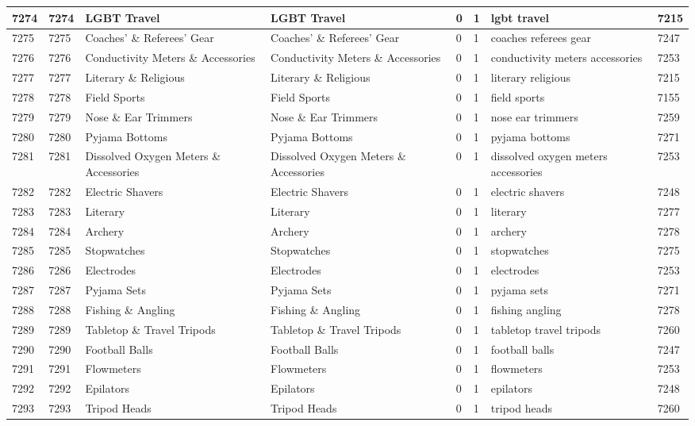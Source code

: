 \begin{longtable}{|l|l|l|l|l|l|l|l|}
7274 & 7274 & LGBT Travel & LGBT Travel & 0 & 1 & lgbt travel & 7215 \\ \hline 
7275 & 7275 & Coaches' \& Referees' Gear & Coaches' \& Referees' Gear & 0 & 1 & coaches referees gear & 7247 \\ \hline 
7276 & 7276 & Conductivity Meters \& Accessories & Conductivity Meters \& Accessories & 0 & 1 & conductivity meters accessories & 7253 \\ \hline 
7277 & 7277 & Literary \& Religious & Literary \& Religious & 0 & 1 & literary religious & 7215 \\ \hline 
7278 & 7278 & Field Sports & Field Sports & 0 & 1 & field sports & 7155 \\ \hline 
7279 & 7279 & Nose \& Ear Trimmers & Nose \& Ear Trimmers & 0 & 1 & nose ear trimmers & 7259 \\ \hline 
7280 & 7280 & Pyjama Bottoms & Pyjama Bottoms & 0 & 1 & pyjama bottoms & 7271 \\ \hline 
7281 & 7281 & Dissolved Oxygen Meters \& Accessories & Dissolved Oxygen Meters \& Accessories & 0 & 1 & dissolved oxygen meters accessories & 7253 \\ \hline 
7282 & 7282 & Electric Shavers & Electric Shavers & 0 & 1 & electric shavers & 7248 \\ \hline 
7283 & 7283 & Literary & Literary & 0 & 1 & literary & 7277 \\ \hline 
7284 & 7284 & Archery & Archery & 0 & 1 & archery & 7278 \\ \hline 
7285 & 7285 & Stopwatches & Stopwatches & 0 & 1 & stopwatches & 7275 \\ \hline 
7286 & 7286 & Electrodes & Electrodes & 0 & 1 & electrodes & 7253 \\ \hline 
7287 & 7287 & Pyjama Sets & Pyjama Sets & 0 & 1 & pyjama sets & 7271 \\ \hline 
7288 & 7288 & Fishing \& Angling & Fishing \& Angling & 0 & 1 & fishing angling & 7278 \\ \hline 
7289 & 7289 & Tabletop \& Travel Tripods & Tabletop \& Travel Tripods & 0 & 1 & tabletop travel tripods & 7260 \\ \hline 
7290 & 7290 & Football Balls & Football Balls & 0 & 1 & football balls & 7247 \\ \hline 
7291 & 7291 & Flowmeters & Flowmeters & 0 & 1 & flowmeters & 7253 \\ \hline 
7292 & 7292 & Epilators & Epilators & 0 & 1 & epilators & 7248 \\ \hline 
7293 & 7293 & Tripod Heads & Tripod Heads & 0 & 1 & tripod heads & 7260 \\ \hline 

\end{longtable}
